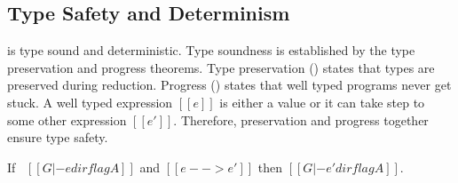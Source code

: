 \subsection{Type Safety and Determinism}
\label{sec:union:safety}
\cal is type sound and deterministic. Type soundness is established
by the type preservation and progress
theorems. Type preservation () states that
types are preserved during reduction. Progress
() states that well typed programs never get
stuck.  A well typed expression $[[e]]$ is either a value or it can
take step to some other expression $[[e']]$. Therefore, preservation and progress
together ensure type safety.

\begin{theorem}
\label{lemma:union:preservation}
  If \ $[[G |- e dirflag A]]$ and $[[e --> e']]$ then $[[G |- e' dirflag A]]$.
\end{theorem}

\begin{comment}
\begin{proof}
  By induction on typing relation and subsequent inverting reduction relation.
  \begin{itemize}
    \item Cases \rref{typ-int, typ-var, typ-sub, typ-abs} are trivial to prove.
    \item Case \rref{typ-ann} requires helping \cref{lemma:union:check-pexpr-ann}.
    \item Case \rref{typ-app} requires helping \cref{lemma:union:pexpr-check-sub}
          and substitution \cref{lemma:union:substitution} for beta reduction.
    \item Case \rref{typ-typeof} requires substitution \cref{lemma:union:substitution}.
  \end{itemize}
\end{proof}

\baber{ToDo: change name of helping lemmas.}

\begin{lemma}[check-pexpr-ann]
\label{lemma:union:check-pexpr-ann}
  If \ $[[G |- p:C <= A]]$ \ then \ $[[G |- p <= A]]$.
\end{lemma}

\begin{lemma}[pexpr-check-sub]
\label{lemma:union:pexpr-check-sub}
  If \ $[[G |- p <= A]]$ \ and \ $[[A <: B]]$ \ then \ $[[G |- p <= B]]$.
\end{lemma}
\end{comment}

